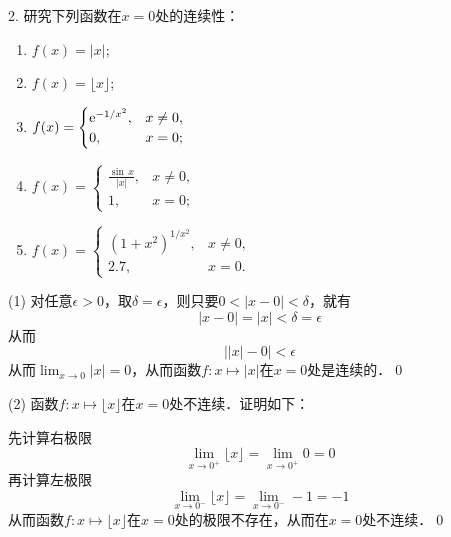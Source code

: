 2. 研究下列函数在$x=0$处的连续性：
\begin{enumerate}
    \item $f(x)=\lvert x \rvert$; 
    \item $f(x)=\lfloor x \rfloor$;
    \item $f(x)=\begin{cases}
       \mathrm{e}^{-1/x^2}, & x \neq 0, \\
       0, & x = 0;
    \end{cases}$ \\
    \item $f(x) = \begin{cases}
        \displaystyle\frac{\sin \, x}{\lvert x \rvert}, & x \neq 0, \\
        1, & x = 0;
    \end{cases}$
    \item $f(x)=\begin{cases}
        (1+x^2)^{1/x^2}, & x \neq 0, \\
        2.7, & x = 0.
    \end{cases}$
\end{enumerate}

(1) \prove 对任意$\epsilon > 0$，取$\delta = \epsilon$，则只要$0 < \lvert x - 0 \rvert < \delta$，就有
\begin{equation}
    \lvert x - 0 \rvert = \lvert x \rvert  < \delta = \epsilon
\end{equation}
从而
\begin{equation}
    \lvert \lvert x \rvert - 0 \rvert < \epsilon
\end{equation}
从而$\displaystyle\lim_{x \to 0} \lvert x \rvert = 0$，从而函数$f: x \mapsto \lvert x \rvert$在$x=0$处是连续的．\qed\bigskip

(2) 函数$f: x \mapsto \lfloor x \rfloor$在$x=0$处不连续．证明如下：\smallskip

\prove 先计算右极限
\begin{equation}
    \lim_{x \to 0^+} \lfloor x \rfloor = \lim_{x \to 0^+} 0 = 0
\end{equation}
再计算左极限
\begin{equation}
    \lim_{x \to 0^-} \lfloor x \rfloor = \lim_{x \to 0^-} -1 = -1
\end{equation}
从而函数$f: x \mapsto \lfloor x \rfloor$在$x=0$处的极限不存在，从而在$x=0$处不连续．\qed\bigskip
